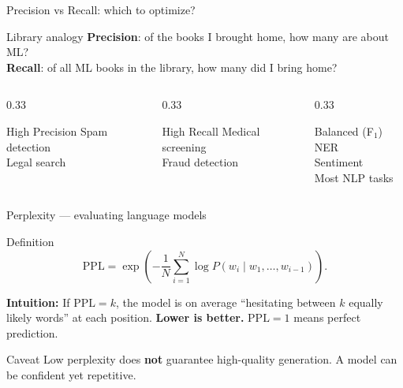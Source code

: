 \documentclass[11pt,aspectratio=169]{beamer}
\begin{document}
\begin{frame}{Precision vs Recall: which to optimize?}
\begin{block}{Library analogy}
\textbf{Precision}: of the books I brought home, how many are about ML?\\
\textbf{Recall}: of all ML books in the library, how many did I bring home?
\end{block}
\vfill
\begin{columns}[T]
\begin{column}{0.33\textwidth}
\begin{block}{High Precision}
Spam detection\\
Legal search
\end{block}
\end{column}
\begin{column}{0.33\textwidth}
\begin{block}{High Recall}
Medical screening\\
Fraud detection
\end{block}
\end{column}
\begin{column}{0.33\textwidth}
\begin{block}{Balanced (F$_1$)}
NER\\
Sentiment\\
Most NLP tasks
\end{block}
\end{column}
\end{columns}
\end{frame}

\begin{frame}{Perplexity --- evaluating language models}
\begin{block}{Definition}
\[ \mathrm{PPL} = \exp\!\left( - \frac{1}{N} \sum_{i=1}^{N} \log P(w_i \mid w_1, \dots, w_{i-1}) \right). \]
\end{block}
\vfill
\textbf{Intuition:} If $\mathrm{PPL} = k$, the model is on average ``hesitating between $k$ equally likely words'' at each position.
\vfill
\textbf{Lower is better.} $\mathrm{PPL} = 1$ means perfect prediction.
\vfill
\begin{alertblock}{Caveat}
Low perplexity does \textbf{not} guarantee high-quality generation. A model can be confident yet repetitive.
\end{alertblock}
\end{frame}
\end{document}
